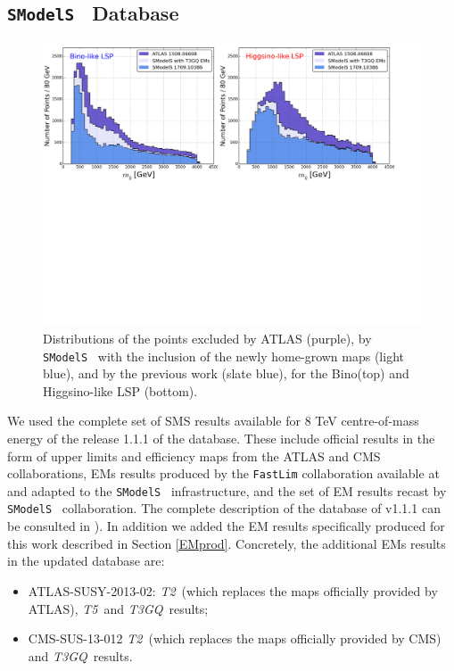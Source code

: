 \documentclass[a4paper,11pt]{article}
\newcommand{\SMO}{\texttt{SModelS\xspace}}
\newcommand{\TGQ}{ \textit{T3GQ}}
\newcommand{\Ttwo}{ \textit{T2}}
\newcommand{\Tfive}{ \textit{T5}}
\begin{document}
\subsection{\SMO~ Database}
\begin{figure}
	\begin{center}
		\includegraphics[width=1\textwidth]{PLOTS/New/New_Res.pdf}	
	\end{center}
	\caption{Distributions of the points excluded by ATLAS (purple), by \SMO~ with the inclusion of the newly home-grown maps (light blue), and by the previous work \cite{Ambrogi:2017lov} (slate blue), for the Bino(top) and Higgsino-like LSP (bottom).}
	\label{pmssm_new_exclusion_gluino}
\end{figure}
We used the complete set of SMS results available for 8 TeV centre-of-mass energy of the release 1.1.1 of the database. These include official results in the form of upper limits and efficiency maps from the ATLAS and CMS collaborations, EMs results produced by the \texttt{FastLim} collaboration available at \cite{fastlim:web} and adapted to the \SMO~ infrastructure, and the set of EM results recast by \SMO~ collaboration. The complete description of the database of v1.1.1 can be consulted in \cite{Ambrogi:2017lov}). In addition we added the EM results specifically produced for this work described in Section \ref{EMprod}. Concretely, the additional EMs results in the updated database are:
\begin{itemize}
	\item ATLAS-SUSY-2013-02: \Ttwo~(which replaces the maps officially provided by ATLAS), \Tfive~and \TGQ~results; \
	\item CMS-SUS-13-012 \Ttwo~(which replaces the maps officially provided by CMS) and \TGQ~results.
\end{itemize}
\end{document}
